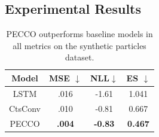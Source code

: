 \subsection{Experimental Results}

\begin{table}
\centering
    \begin{tabular}{c|c c c}
     \toprule
  \textbf{Model} & MSE $\downarrow$ & NLL$\downarrow$  & ES  $\downarrow$\\ 
  \midrule
  LSTM & .016 &  -1.61 & 1.041 \\
  CtsConv & .010 &  -0.81  & 0.667 \\
  PECCO & \textbf{.004} & \textbf{-0.83} & \textbf{0.467} \\
    \bottomrule
    \end{tabular}
\caption{PECCO outperforms baseline models in all metrics on the synthetic particles dataset. }
\label{tab:particles}
\end{table}

